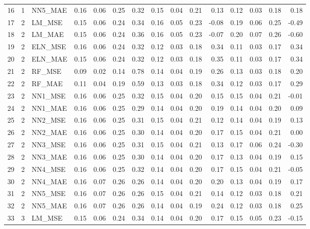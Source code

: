 \begin{longtable}{rrlrrrrrrrrrrrr}
  16 &   1 & NN5\_MAE & 0.16 & 0.06 & 0.25 & 0.32 & 0.15 & 0.04 & 0.21 & 0.13 & 0.12 & 0.03 & 0.18 & 0.18 \\ 
  17 &   2 & LM\_MSE & 0.15 & 0.06 & 0.24 & 0.34 & 0.16 & 0.05 & 0.23 & -0.08 & 0.19 & 0.06 & 0.25 & -0.49 \\ 
  18 &   2 & LM\_MAE & 0.15 & 0.06 & 0.24 & 0.36 & 0.16 & 0.05 & 0.23 & -0.07 & 0.20 & 0.07 & 0.26 & -0.60 \\ 
  19 &   2 & ELN\_MSE & 0.16 & 0.06 & 0.24 & 0.32 & 0.12 & 0.03 & 0.18 & 0.34 & 0.11 & 0.03 & 0.17 & 0.34 \\ 
  20 &   2 & ELN\_MAE & 0.15 & 0.06 & 0.24 & 0.32 & 0.12 & 0.03 & 0.18 & 0.35 & 0.11 & 0.03 & 0.17 & 0.34 \\ 
  21 &   2 & RF\_MSE & 0.09 & 0.02 & 0.14 & 0.78 & 0.14 & 0.04 & 0.19 & 0.26 & 0.13 & 0.03 & 0.18 & 0.20 \\ 
  22 &   2 & RF\_MAE & 0.11 & 0.04 & 0.19 & 0.59 & 0.13 & 0.03 & 0.18 & 0.34 & 0.12 & 0.03 & 0.17 & 0.29 \\ 
  23 &   2 & NN1\_MSE & 0.16 & 0.06 & 0.25 & 0.32 & 0.15 & 0.04 & 0.20 & 0.15 & 0.15 & 0.04 & 0.21 & -0.01 \\ 
  24 &   2 & NN1\_MAE & 0.16 & 0.06 & 0.25 & 0.29 & 0.14 & 0.04 & 0.20 & 0.19 & 0.14 & 0.04 & 0.20 & 0.09 \\ 
  25 &   2 & NN2\_MSE & 0.16 & 0.06 & 0.25 & 0.31 & 0.15 & 0.04 & 0.21 & 0.12 & 0.14 & 0.04 & 0.19 & 0.13 \\ 
  26 &   2 & NN2\_MAE & 0.16 & 0.06 & 0.25 & 0.30 & 0.14 & 0.04 & 0.20 & 0.17 & 0.15 & 0.04 & 0.21 & 0.00 \\ 
  27 &   2 & NN3\_MSE & 0.16 & 0.06 & 0.25 & 0.31 & 0.15 & 0.04 & 0.21 & 0.13 & 0.17 & 0.06 & 0.24 & -0.30 \\ 
  28 &   2 & NN3\_MAE & 0.16 & 0.06 & 0.25 & 0.30 & 0.14 & 0.04 & 0.20 & 0.17 & 0.13 & 0.04 & 0.19 & 0.15 \\ 
  29 &   2 & NN4\_MSE & 0.16 & 0.06 & 0.25 & 0.32 & 0.14 & 0.04 & 0.20 & 0.17 & 0.15 & 0.04 & 0.21 & -0.05 \\ 
  30 &   2 & NN4\_MAE & 0.16 & 0.07 & 0.26 & 0.26 & 0.14 & 0.04 & 0.20 & 0.20 & 0.13 & 0.04 & 0.19 & 0.17 \\ 
  31 &   2 & NN5\_MSE & 0.16 & 0.07 & 0.26 & 0.26 & 0.15 & 0.04 & 0.21 & 0.14 & 0.12 & 0.03 & 0.18 & 0.21 \\ 
  32 &   2 & NN5\_MAE & 0.16 & 0.07 & 0.26 & 0.26 & 0.14 & 0.04 & 0.19 & 0.24 & 0.12 & 0.03 & 0.18 & 0.25 \\ 
  33 &   3 & LM\_MSE & 0.15 & 0.06 & 0.24 & 0.34 & 0.14 & 0.04 & 0.20 & 0.17 & 0.15 & 0.05 & 0.23 & -0.15 \\ 

\end{longtable}
